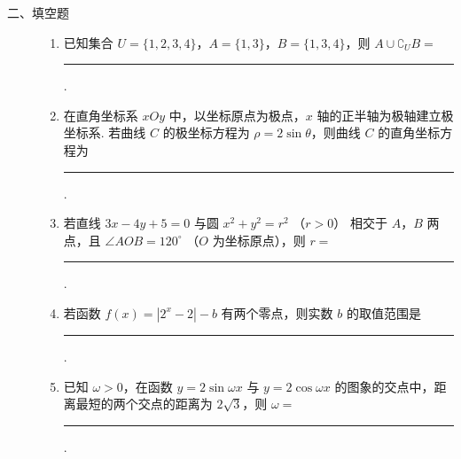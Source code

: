 \begin{description}

    \item[二、填空题]

    \begin{enumerate}[leftmargin=5pt]

      \addtocounter{enumi}{+10}

        \item 已知集合 \(U = \{1, 2, 3, 4\}\)，\(A = \{1, 3\}\)，\(B = \{1, 3, 4\}\)，则 \(A \cup \complement_U B = \)\rule[-0.3ex]{3em}{0.4pt}.

        \item 在直角坐标系 \(xOy\) 中，以坐标原点为极点，\(x\) 轴的正半轴为极轴建立极坐标系. 若曲线 \(C\) 的极坐标方程为 \(\rho = 2\sin \theta\)，则曲线 \(C\) 的直角坐标方程为\rule[-0.3ex]{3em}{0.4pt}.

        \item 若直线 \(3x - 4y + 5 = 0\) 与圆 \(x^{2} + y^{2} = r^{2}\) （\(r > 0\)） 相交于 \(A\)，\(B\) 两点，且 \(\angle AOB = 120^{\circ}\) （\(O\) 为坐标原点），则 \(r = \)\rule[-0.3ex]{3em}{0.4pt}.

        \item 若函数 \( f(x) = |2^x - 2| - b \) 有两个零点，则实数 \( b \) 的取值范围是\rule[-0.3ex]{3em}{0.4pt}.

        \item 已知 \(\omega > 0\)，在函数 \(y = 2\sin \omega x\) 与 \(y = 2\cos \omega x\) 的图象的交点中，距离最短的两个交点的距离为 \(2\sqrt{3}\)，则 \(\omega = \)\rule[-0.3ex]{3em}{0.4pt}.

    \end{enumerate}

\end{description}

